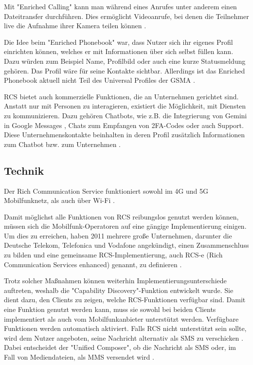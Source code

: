 \documentclass[conference]{IEEEtran}
\begin{document}
Mit "Enriched Calling" kann man während eines Anrufes unter anderem einen Dateitransfer durchführen.
Dies ermöglicht Videoanrufe, bei denen die Teilnehmer live die Aufnahme ihrer Kamera teilen können \cite{uniprof}.

Die Idee beim "Enriched Phonebook" war, dass Nutzer sich ihr eigenes Profil einrichten können, welches er mit Informationen über sich selbst füllen kann.
Dazu würden zum Beispiel Name, Profilbild oder auch eine kurze Statusmeldung gehören.
Das Profil wäre für seine Kontakte sichtbar.
Allerdings ist das Enriched Phonebook aktuell nicht Teil des Universal Profiles der GSMA \cite{rcsuite,uniprof}.

RCS bietet auch kommerzielle Funktionen, die an Unternehmen gerichtet sind.
Anstatt nur mit Personen zu interagieren, existiert die Möglichkeit, mit Diensten zu kommunizieren. Dazu gehören Chatbots, wie z.B. die Integrierung von Gemini in Google Messages \cite{geminiinteg}, Chats zum Empfangen von 2FA-Codes oder auch Support. Diese Unternehmenskontakte beinhalten in deren Profil zusätzlich Informationen zum Chatbot bzw. zum Unternehmen \cite{uniprof}.


\subsection{Technik}

Der Rich Communication Service funktioniert sowohl im 4G und 5G Mobilfunknetz, als auch über Wi-Fi \cite{5gmsg}.

Damit möglichst alle Funktionen von RCS reibungslos genutzt werden können, müssen sich die Mobilfunk-Operatoren auf eine gängige Implementierung einigen.
Um dies zu erreichen, haben 2011 mehrere große Unternehmen, darunter die Deutsche Telekom, Telefonica und Vodafone angekündigt, einen Zusammenschluss zu bilden und eine gemeinsame RCS-Implementierung, auch RCS-e (Rich Communication Services enhanced) genannt, zu definieren \cite{rcsmno}.

Trotz solcher Maßnahmen können weiterhin Implementierungsunterschiede auftreten, weshalb die "Capability Discovery"-Funktion entwickelt wurde.
Sie dient dazu, den Clients zu zeigen, welche RCS-Funktionen verfügbar sind.
Damit eine Funktion genutzt werden kann, muss sie sowohl bei beiden Clients implementiert als auch vom Mobilfunkanbieter unterstützt werden.
Verfügbare Funktionen werden automatisch aktiviert.
Falls RCS nicht unterstützt sein sollte, wird dem Nutzer angeboten, seine Nachricht alternativ als SMS zu verschicken \cite{uniprof}.
Dabei entscheidet der "Unified Composer", ob die Nachricht als SMS oder, im Fall von Mediendateien, als MMS versendet wird \cite{rcsuite}.
\end{document}

